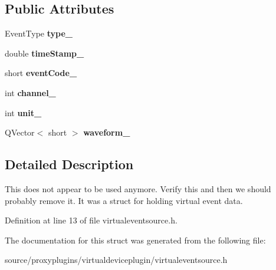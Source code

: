 \subsection*{Public Attributes}
\begin{DoxyCompactItemize}
\item 
\hypertarget{struct_virtual_event_aff7e79e79a5120e8ec6b49709ebecff6}{Event\-Type {\bfseries type\-\_\-}}\label{struct_virtual_event_aff7e79e79a5120e8ec6b49709ebecff6}

\item 
\hypertarget{struct_virtual_event_af8afe37513ba6f76abab508fda7b146b}{double {\bfseries time\-Stamp\-\_\-}}\label{struct_virtual_event_af8afe37513ba6f76abab508fda7b146b}

\item 
\hypertarget{struct_virtual_event_a7c16891a0d906b25dccd6973b16b02ea}{short {\bfseries event\-Code\-\_\-}}\label{struct_virtual_event_a7c16891a0d906b25dccd6973b16b02ea}

\item 
\hypertarget{struct_virtual_event_a4999935ff11523f51d5fb553f1ee938b}{int {\bfseries channel\-\_\-}}\label{struct_virtual_event_a4999935ff11523f51d5fb553f1ee938b}

\item 
\hypertarget{struct_virtual_event_abfab62c1ac260f157dee744052d3b909}{int {\bfseries unit\-\_\-}}\label{struct_virtual_event_abfab62c1ac260f157dee744052d3b909}

\item 
\hypertarget{struct_virtual_event_a2d05e17d7e25c1195f027f88ca888d52}{Q\-Vector$<$ short $>$ {\bfseries waveform\-\_\-}}\label{struct_virtual_event_a2d05e17d7e25c1195f027f88ca888d52}

\end{DoxyCompactItemize}


\subsection{Detailed Description}
This does not appear to be used anymore. Verify this and then we should probably remove it. It was a struct for holding virtual event data. 

Definition at line 13 of file virtualeventsource.\-h.



The documentation for this struct was generated from the following file\-:\begin{DoxyCompactItemize}
\item 
source/proxyplugins/virtualdeviceplugin/virtualeventsource.\-h\end{DoxyCompactItemize}
